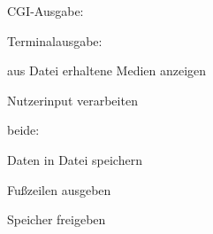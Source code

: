 C\+G\+I-\/\+Ausgabe\+:

Terminalausgabe\+:


\begin{DoxyItemize}
\item aus Datei erhaltene Medien anzeigen
\item Nutzerinput verarbeiten
\end{DoxyItemize}

beide\+:


\begin{DoxyItemize}
\item Daten in Datei speichern
\item Fußzeilen ausgeben
\item Speicher freigeben 
\end{DoxyItemize}